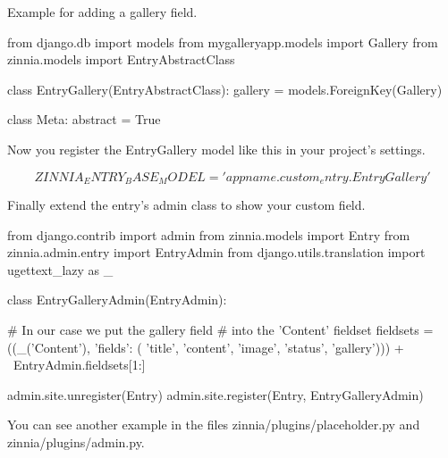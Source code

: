 Example for adding a gallery field.

\begin{code}
from django.db import models
from mygalleryapp.models import Gallery
from zinnia.models import EntryAbstractClass

class EntryGallery(EntryAbstractClass):
  gallery = models.ForeignKey(Gallery)

  class Meta:
    abstract = True
\end{code}

Now you register the EntryGallery model like this in your project’s settings.

$$ ZINNIA_ENTRY_BASE_MODEL = 'appname.custom_entry.EntryGallery' $$

Finally extend the entry’s admin class to show your custom field.

\begin{code}
from django.contrib import admin
from zinnia.models import Entry
from zinnia.admin.entry import EntryAdmin
from django.utils.translation import ugettext_lazy as _

class EntryGalleryAdmin(EntryAdmin):

  # In our case we put the gallery field
  # into the 'Content' fieldset
  fieldsets = ((_('Content'), {'fields': (
    'title', 'content', 'image', 'status', 'gallery')})) + \
    EntryAdmin.fieldsets[1:]

admin.site.unregister(Entry)
admin.site.register(Entry, EntryGalleryAdmin)
\end{code}

You can see another example in the files zinnia/plugins/placeholder.py and zinnia/plugins/admin.py.
